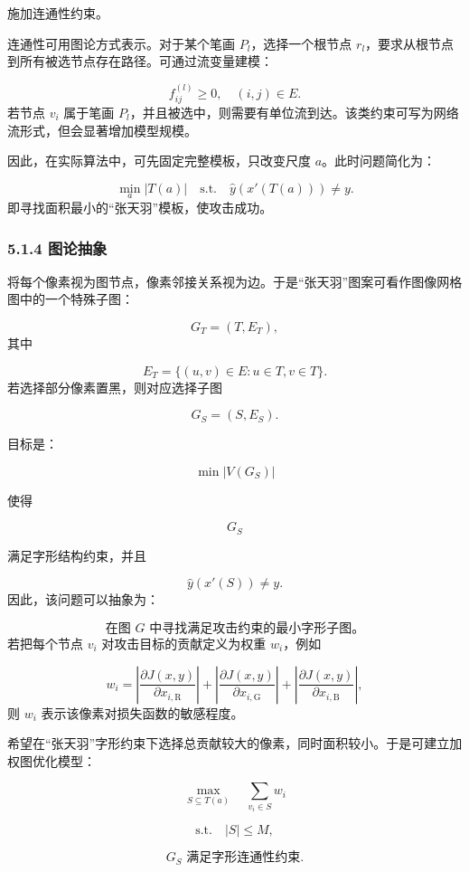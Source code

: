 ﻿\documentclass[UTF8,zihao=-4,fontset=none]{ctexart}
\begin{document}
施加连通性约束。

连通性可用图论方式表示。对于某个笔画 \(P_l\)，选择一个根节点 \(r_l\)，要求从根节点到所有被选节点存在路径。可通过流变量建模：

\[
f_{ij}^{(l)}\ge 0,
\quad (i,j)\in E.
\]
\noindent 若节点 \(v_i\) 属于笔画 \(P_l\)，并且被选中，则需要有单位流到达。该类约束可写为网络流形式，但会显著增加模型规模。

因此，在实际算法中，可先固定完整模板，只改变尺度 \(a\)。此时问题简化为：

\[
\min_a |T(a)|
\quad
\mathrm{s.t.}
\quad
\hat y(x'(T(a)))\ne y.
\]
\noindent 即寻找面积最小的“张天羽”模板，使攻击成功。

\subsubsection*{5.1.4 图论抽象}
{}

将每个像素视为图节点，像素邻接关系视为边。于是“张天羽”图案可看作图像网格图中的一个特殊子图：

\[
G_T=(T,E_T),
\]
\noindent 其中

\[
E_T=\{(u,v)\in E:u\in T,v\in T\}.
\]
\noindent 若选择部分像素置黑，则对应选择子图

\[
G_S=(S,E_S).
\]

目标是：

\[
\min |V(G_S)|
\]

使得

\[
G_S
\]

满足字形结构约束，并且

\[
\hat y(x'(S))\ne y.
\]
\noindent 因此，该问题可以抽象为：

\[
\text{在图 }G\text{ 中寻找满足攻击约束的最小字形子图。}
\]
\noindent 若把每个节点 \(v_i\) 对攻击目标的贡献定义为权重 \(w_i\)，例如

\[
w_i
=
\left|
\frac{\partial J(x,y)}{\partial x_{i,\mathrm{R}}}
\right|
+
\left|
\frac{\partial J(x,y)}{\partial x_{i,\mathrm{G}}}
\right|
+
\left|
\frac{\partial J(x,y)}{\partial x_{i,\mathrm{B}}}
\right|,
\]
\noindent 则 \(w_i\) 表示该像素对损失函数的敏感程度。

希望在“张天羽”字形约束下选择总贡献较大的像素，同时面积较小。于是可建立加权图优化模型：

\[
\max_{S\subseteq T(a)}
\quad
\sum_{v_i\in S}w_i
\]

\[
\mathrm{s.t.}
\quad
|S|\le M,
\]

\[
G_S\text{ 满足字形连通性约束}.
\]
\end{document}
